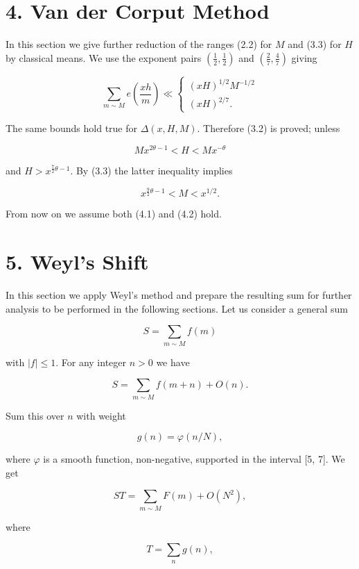 \documentclass[10pt]{article}
\begin{document}
\section*{4. Van der Corput Method}
In this section we give further reduction of the ranges (2.2) for $M$ and (3.3) for $H$ by classical means. We use the exponent pairs $\left(\frac{1}{2}, \frac{1}{2}\right)$ and $\left(\frac{2}{7}, \frac{4}{7}\right)$ giving

$$
\sum_{m \sim M} e\left(\frac{x h}{m}\right) \ll\left\{\begin{array}{l}
(x H)^{1 / 2} M^{-1 / 2} \\
(x H)^{2 / 7} .
\end{array}\right.
$$

The same bounds hold true for $\Delta(x, H, M)$. Therefore (3.2) is proved; unless


\begin{equation*}
Mx^{2\theta-1}<H<Mx^{-\theta} \tag{4.1}
\end{equation*}


and $H>x^{\frac{7}{2} \theta-1}$. By (3.3) the latter inequality implies


\begin{equation*}
x^{\frac{9}{2} \theta-1}<M<x^{1 / 2} . \tag{4.2}
\end{equation*}


From now on we assume both (4.1) and (4.2) hold.

\section*{5. Weyl's Shift}
In this section we apply Weyl's method and prepare the resulting sum for further analysis to be performed in the following sections. Let us consider a general sum

$$
S=\sum_{m \sim M} f(m)
$$

with $|f| \leqslant 1$. For any integer $n>0$ we have

$$
S=\sum_{m \sim M} f(m+n)+O(n) .
$$

Sum this over $n$ with weight

$$
g(n)=\varphi(n / N),
$$

where $\varphi$ is a smooth function, non-negative, supported in the interval [5, 7]. We get

$$
S T=\sum_{m \sim M} F(m)+O\left(N^{2}\right),
$$

where

$$
T=\sum_{n} g(n),
$$
\end{document}
